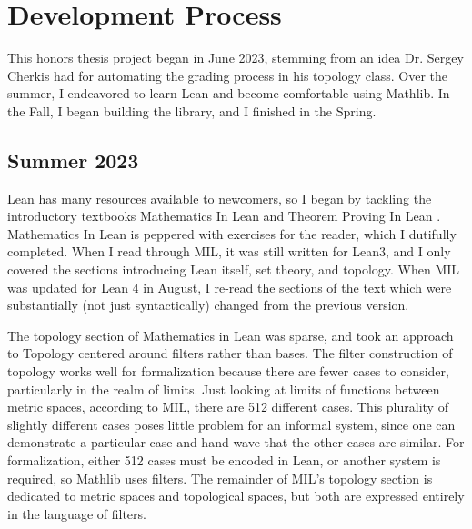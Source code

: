 

\chapter[Development]{Development Process}

This honors thesis project began in June 2023, stemming from
an idea Dr. Sergey Cherkis had for automating the grading
process in his topology class. Over the summer, I endeavored
to learn Lean and become comfortable using Mathlib. In the Fall,
I began building the library, and I finished in the Spring.

\section{Summer 2023}

Lean has many resources available to newcomers, so I began
by tackling the introductory textbooks Mathematics In Lean \cite{MIL} and
Theorem Proving In Lean \cite{TPiL}. Mathematics In Lean is peppered with
exercises for the reader, which I dutifully completed. When
I read through MIL, it was still written for Lean3, and I only 
covered the sections introducing Lean itself, set theory, and
topology. When MIL was updated for Lean 4 in August, I re-read the
sections of the text which were substantially (not just syntactically)
changed from the previous version.

The topology section of Mathematics in Lean was sparse, and took 
an approach to Topology centered around filters rather than bases. 
The filter construction of topology works well for formalization 
because there are fewer cases to consider, particularly
in the realm of limits. Just looking at limits of functions between
metric spaces, according to MIL, there are 512 different cases. This 
plurality of slightly different cases poses little problem for an 
informal system, since one can demonstrate a particular case and
hand-wave that the other cases are similar. For formalization, 
either 512 cases must be encoded in Lean, or another system is required,
so Mathlib uses filters. The remainder of MIL's topology section
is dedicated to metric spaces and topological spaces, but both
are expressed entirely in the language of filters.

